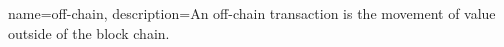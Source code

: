 {
    name=off-chain,
    description={An off-chain transaction is the movement of value outside of the block chain.}
}